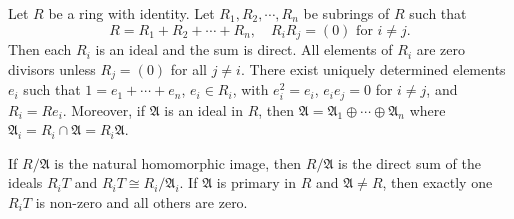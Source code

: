 Let $R$ be a ring with identity. Let $R_1, R_2, \cdots, R_n$ be subrings of $R$ such that
$$R = R_1 + R_2 + \cdots + R_n, \quad R_i R_j = (0) \text{ for } i \neq j.$$
Then each $R_i$ is an ideal and the sum is direct. All elements of $R_i$ are zero divisors unless $R_j = (0)$ for all $j \neq i$. There exist uniquely determined elements $e_i$ such that $1 = e_1 + \cdots + e_n$, $e_i \in R_i$, with $e_i^2 = e_i$, $e_i e_j = 0$ for $i \neq j$, and $R_i = Re_i$. Moreover, if $\mathfrak{A}$ is an ideal in $R$, then $\mathfrak{A} = \mathfrak{A}_1 \oplus \cdots \oplus \mathfrak{A}_n$ where $\mathfrak{A}_i = R_i \cap \mathfrak{A} = R_i\mathfrak{A}$.

If $R/\mathfrak{A}$ is the natural homomorphic image, then $R/\mathfrak{A}$ is the direct sum of the ideals $R_iT$ and $R_iT \cong R_i/\mathfrak{A}_i$. If $\mathfrak{A}$ is primary in $R$ and $\mathfrak{A} \neq R$, then exactly one $R_iT$ is non-zero and all others are zero.

